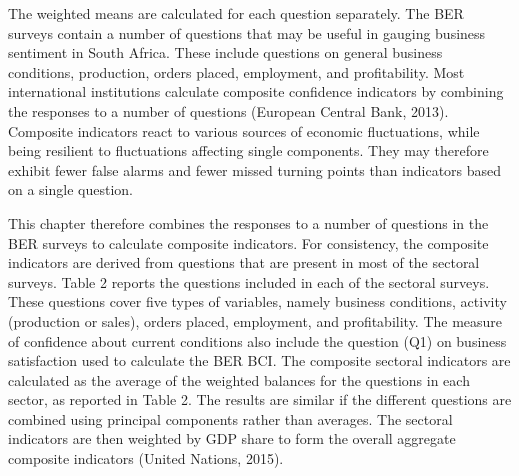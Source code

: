 \documentclass[11pt,]{article}
\begin{document}
The weighted means are calculated for each question separately. The BER
surveys contain a number of questions that may be useful in gauging
business sentiment in South Africa. These include questions on general
business conditions, production, orders placed, employment, and
profitability. Most international institutions calculate composite
confidence indicators by combining the responses to a number of
questions (European Central Bank, 2013). Composite indicators react to
various sources of economic fluctuations, while being resilient to
fluctuations affecting single components. They may therefore exhibit
fewer false alarms and fewer missed turning points than indicators based
on a single question.

This chapter therefore combines the responses to a number of questions
in the BER surveys to calculate composite indicators. For consistency,
the composite indicators are derived from questions that are present in
most of the sectoral surveys. Table 2 reports the questions included in
each of the sectoral surveys. These questions cover five types of
variables, namely business conditions, activity (production or sales),
orders placed, employment, and profitability. The measure of confidence
about current conditions also include the question (Q1) on business
satisfaction used to calculate the BER BCI. The composite sectoral
indicators are calculated as the average of the weighted balances for
the questions in each sector, as reported in Table 2. The results are
similar if the different questions are combined using principal
components rather than averages. The sectoral indicators are then
weighted by GDP share to form the overall aggregate composite indicators
(United Nations, 2015).

\begin{table}[]
\centering
\caption{Survey questions used by sector}
\end{table}
\end{document}
